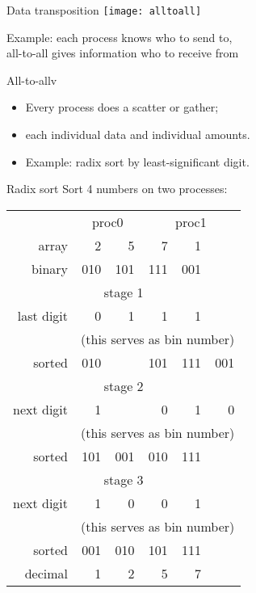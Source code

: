 \begin{numberedframe}{Data transposition}
  \texttt{[image: alltoall]}

  Example: each process knows who to send to, \\
  all-to-all gives information who to receive from
\end{numberedframe}

\begin{numberedframe}{All-to-allv}
  \begin{itemize}
  \item Every process does a scatter or gather;
  \item each individual data and individual amounts.
  \item Example: radix sort by least-significant digit.
  \end{itemize}
\end{numberedframe}

\begin{numberedframe}{Radix sort}
  \scriptsize
  Sort 4 numbers on two processes:

  \begin{tabular}{|r|rr|rrr|}
    \hline
    & \multicolumn{2}{|c}{proc0}&\multicolumn{3}{|c|}{proc1}\\
    array     & 2&5&7&1&\\
    binary    & 010& 101& 111& 001&\\
    \hline
    \multicolumn{6}{|c|}{stage 1}\\
    \hline
    last digit&   0&   1&   1&   1&\\
    &\multicolumn{5}{|c|}{(this serves as bin number)}\\
    sorted    & 010&    & 101& 111& 001\\
    \multicolumn{6}{|c|}{stage 2}\\
    \hline
    next digit&  1 &    &  0 &  1 &  0\\
    &\multicolumn{5}{|c|}{(this serves as bin number)}\\
    sorted    & 101& 001& 010& 111&\\
    \multicolumn{6}{|c|}{stage 3}\\
    \hline
    next digit& 1  & 0  & 0  & 1&\\
    &\multicolumn{5}{|c|}{(this serves as bin number)}\\
    sorted    & 001& 010& 101& 111&\\
    decimal   & 1  & 2  & 5  & 7&\\
    \hline
  \end{tabular}
\end{numberedframe}

